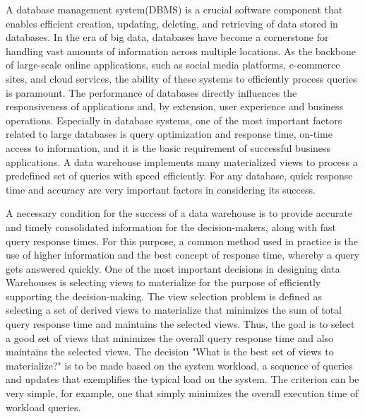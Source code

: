 A database management system(DBMS) is a crucial software component that enables efficient creation, updating, deleting, and retrieving of data stored in databases. In the era of big data, databases have become a cornerstone for handling vast amounts of information across multiple locations. As the backbone of large-scale online applications, such as social media platforms, e-commerce sites, and cloud services, the ability of these systems to efficiently process queries is paramount. The performance of databases directly influences the responsiveness of applications and, by extension, user experience and business operations.\cite{4} Especially in database systems, one of the most important factors related to large databases is query optimization and response time, on-time access to information, and it is the basic requirement of successful business applications. A data warehouse implements many materialized views to process a predefined set of queries with speed efficiently. For any database, quick response time and accuracy are very important factors in considering its success.\cite{karde2010selection}\vspace{.4cm} 

A necessary condition for the success of a data warehouse is to provide accurate and timely consolidated information for the decision-makers, along with fast query response times. For this purpose, a common method used in practice is the use of higher information and the best concept of response time, whereby a query gets answered quickly. One of the most important decisions in designing data Warehouses is selecting views to materialize for the purpose of efficiently supporting the decision-making. The view selection problem is defined as selecting a set of derived views to materialize that minimizes the sum of total query response time and maintains the selected views. Thus, the goal is to select a good set of views that minimizes the overall query response time and also maintains the selected views. The decision "What is the best set of views to materialize?" is to be made based on the system workload, a sequence of queries and updates that exemplifies the typical load on the system. The criterion can be very simple, for example, one that simply minimizes the overall execution time of workload queries.\vspace{.4cm}

